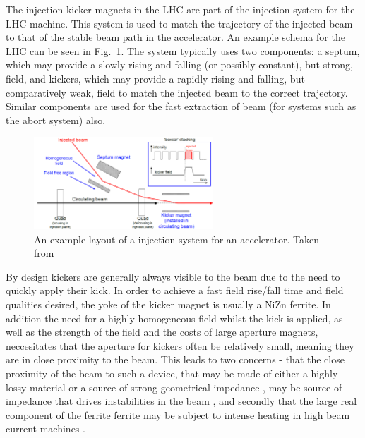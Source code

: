 The injection kicker magnets in the LHC are part of the injection system for the LHC machine. This system is used to match the trajectory of the injected beam to that of the stable beam path in the accelerator. An example schema for the LHC can be seen in Fig.~\ref{fig:injection-system-schema}. The system typically uses two components: a septum, which may provide a slowly rising and falling (or possibly constant), but strong, field, and kickers, which may provide a rapidly rising and falling, but comparatively weak, field to match the injected beam to the correct trajectory. Similar components are used for the fast extraction of beam (for systems such as the abort system) also.

\begin{figure}
\begin{center}
\includegraphics[width=0.6\textwidth]{LHC_MKI/figures/injection-system.png}
\end{center}
\caption{An example layout of a injection system for an accelerator. Taken from \cite{Barnes:injSys}}
\label{fig:injection-system-schema}
\end{figure}

By design kickers are generally always visible to the beam due to the need to quickly apply their kick. In order to achieve a fast field rise/fall time and field qualities desired, the yoke of the kicker magnet is usually a NiZn ferrite. In addition the need for a highly homogeneous field whilst the kick is applied, as well as the strength of the field and the costs of large aperture magnets, neccesitates that the aperture for kickers often be relatively small, meaning they are in close proximity to the beam. This leads to two concerns - that the close proximity of the beam to such a device, that may be made of either a highly lossy material \cite{Day:wireMeasFerr, Barnes:wireMeasKick, Barnes:spsKickerHeating} or a source of strong geometrical impedance \cite{Belver-Aguilar:clicStripline}, may be source of impedance that drives instabilities in the beam \cite{Salvant:spsImpModel}, and secondly that the large real component of the ferrite ferrite may be subject to intense heating in high beam current machines \cite{Barnes:spsKickerHeating}. 

